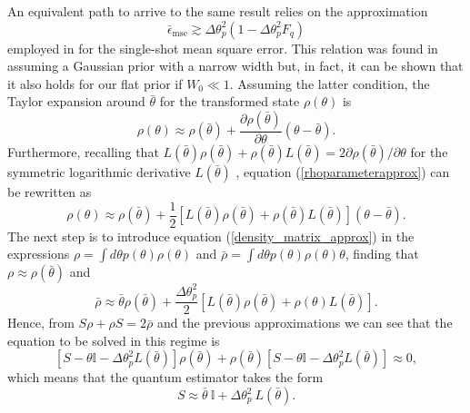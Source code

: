 An equivalent path to arrive to the same result relies on the approximation
\begin{equation}
\bar{\epsilon}_{\mathrm{mse}}\gtrsim\Delta \theta_p^2\left(1-\Delta\theta_p^2 F_q\right)
\label{bayes_bound_high_prior}
\end{equation}
employed in \cite{macieszczak2014bayesian, jarzyna2015true} for the single-shot mean square error. This relation was found in \cite{macieszczak2014bayesian} assuming a Gaussian prior with a narrow width but, in fact, it can be shown that it also holds for our flat prior if $W_0 \ll 1$. Assuming the latter condition, the Taylor expansion around $\bar{\theta}$ for the transformed state $\rho(\theta)$ is
\begin{equation} 
\rho(\theta) \approx \rho(\bar{\theta}) + \frac{\partial \rho(\bar{\theta})}{\partial \theta} (\theta - \bar{\theta}).
\label{rhoparameterapprox}
\end{equation}
Furthermore, recalling that $L(\bar{\theta})\rho(\bar{\theta}) + \rho(\bar{\theta}) L(\bar{\theta}) = 2\partial \rho(\bar{\theta})/\partial \theta$ for the symmetric logarithmic derivative $L(\bar{\theta})$ \cite{helstrom1976,paris2009,rafal2015}, equation (\ref{rhoparameterapprox}) can be rewritten as
\begin{equation}
\rho(\theta)  \approx \rho(\bar{\theta}) + \frac{1}{2}\left[ L(\bar{\theta})\rho(\bar{\theta}) + \rho(\bar{\theta}) L(\bar{\theta})\right] (\theta - \bar{\theta} ).
\label{density_matrix_approx}
\end{equation}
The next step is to introduce equation (\ref{density_matrix_approx}) in the expressions $\rho = \int d\theta p(\theta) \rho(\theta)$ and $\bar{\rho} = \int d\theta p(\theta) \rho(\theta) \theta$, finding that $\rho \approx \rho(\bar{\theta})$ and
\begin{equation}
\bar{\rho} \approx \bar{\theta}\rho(\bar{\theta}) +  \frac{\Delta \theta^2_p}{2}\left[ L(\bar{\theta})\rho(\bar{\theta}) + \rho(\theta) L(\bar{\theta})\right].
\end{equation}
Hence, from $S\rho + \rho S = 2\bar{\rho}$ and the previous approximations we can see that the equation to be solved in this regime is
\begin{equation}
\left[S - \theta \mathbb{I} - \Delta \theta^2_p L(\bar{\theta})\right]\rho(\bar{\theta}) + \rho(\bar{\theta}) \left[S - \theta \mathbb{I} - \Delta \theta^2_p L(\bar{\theta})\right] \approx 0, 
\end{equation} 
which means that the quantum estimator takes the form 
\begin{equation}
S \approx \bar{\theta} ~\mathbb{I} + \Delta \theta^2_p ~ L(\bar{\theta}).
\end{equation}
